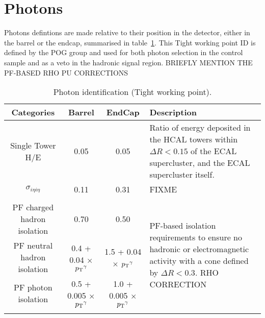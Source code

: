 \section{Photons}  %
\label{sec:objects_photons}

Photons defintions are made relative to their position in the detector, either 
in the barrel or the endcap, summarised in table~\ref{tab:photon-id-egamma}. 
This Tight working point ID is defined by the POG group and used for both photon
selection in the \gj control sample and as a veto in the hadronic signal region.
BRIEFLY MENTION THE PF-BASED RHO PU CORRECTIONS

\begin{table}[ht!]
  \caption{Photon identification (Tight working point).\label{tab:photon-id-egamma}}
  \centering
  \scriptsize
  \begin{tabular}{ cccp{4cm} }
    \hline
    \hline
    Categories                    & Barrel                             & EndCap 
    & Description                         \\
    \hline
    Single Tower H/E              & 0.05                               & 0.05                               
    & Ratio of energy deposited in the HCAL towers within $\Delta R<0.15$ of the ECAL 
    supercluster, and the ECAL supercluster itself. \\
    $\sigma_{i\eta i\eta}$        & 0.11                               & 0.31 & 
    FIXME \\
    &&&\multirow{5}{4cm}{PF-based isolation requirements to ensure no hadronic or electromagnetic 
    activity with a cone defined by $\Delta R < 0.3$. RHO CORRECTION}\\
    PF charged hadron isolation   & 0.70                               & 0.50                               & \\
    PF neutral hadron isolation   & 0.4 + 0.04 $\times$ ${p_{\text T}}^{\gamma}$  & 1.5 + 0.04 $\times$ ${p_{\text T}}^{\gamma}$&
    \\
    PF photon isolation           & 0.5 + 0.005 $\times$ ${p_{\text T}}^{\gamma}$ & 1.0 + 0.005 $\times$ ${p_{\text T}}^{\gamma}$& \\
    \\
    \hline
    \hline
  \end{tabular}
\end{table}

